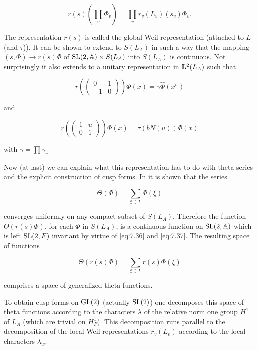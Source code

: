\begin{equation}\label{eq:7.35}
r(s)\left(\prod_v \Phi_v\right) = \prod_v r_v(L_v)(s_v)\Phi_v.\tag{7.35}
\end{equation}

The representation $r(s)$ is called the global Weil representation (attached to $L$ (and $\tau$)). It can be shown to extend to $S(L_A)$ in such a way that the mapping $(s, \Phi) \to r(s)\Phi$ of $\operatorname{SL}(2,\mathbb{A}) \times S(L_A)$ into $S(L_A)$ is continuous. Not surprisingly it also extends to a unitary representation in $\mathbf{L}^2(L_A)$ such that

\begin{equation}\label{eq:7.36}
r\left(\begin{pmatrix} 0 & 1 \\ -1 & 0 \end{pmatrix}\right)\Phi(x) = \gamma\hat{\Phi}(x^{\sigma})\tag{7.36}
\end{equation}

and

\begin{equation}\label{eq:7.37}
r\left(\begin{pmatrix} 1 & u \\ 0 & 1 \end{pmatrix}\right)\Phi(x) = \tau(bN(u))\Phi(x)\tag{7.37}
\end{equation}

with $\gamma = \prod \gamma_v$

Now (at last) we can explain what this representation has to do with theta-series and the explicit construction of cusp forms. In \cite{Weil3} it is shown that the series

\begin{equation}\label{eq:7.38}
\Theta(\Phi) = \sum_{\xi \in L} \Phi(\xi)\tag{7.38}
\end{equation}

converges uniformly on any compact subset of $S(L_A)$. Therefore the function $\Theta(r(s)\Phi)$, for each $\Phi$ in $S(L_A)$, is a continuous function on $\operatorname{SL}(2,\mathbb{A})$ which is left $\operatorname{SL}(2,F)$ invariant by virtue of \eqref{eq:7.36} and \eqref{eq:7.37}. The resulting space of functions

\begin{equation}\label{eq:7.39}
\Theta(r(s)\Phi) = \sum_{\xi \in L} r(s)\Phi(\xi)\tag{7.39}
\end{equation}

comprises a space of generalized theta functions.

To obtain cusp forms on $\operatorname{GL}(2)$ (actually $\operatorname{SL}(2)$) one decomposes this space of theta functions according to the characters $\lambda$ of the relative norm one group $H^1$ of $L_A$ (which are trivial on $H_F^1$). This decomposition runs parallel to the decomposition of the local Weil representations $r_v(L_v)$ according to the local characters $\lambda_w$.

